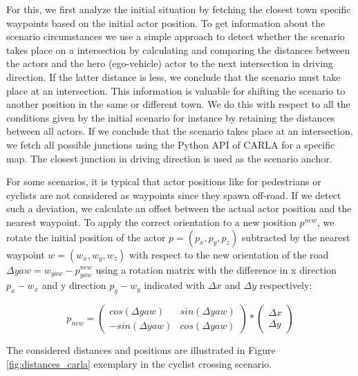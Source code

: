 \documentclass[conference, a4paper, 11pt]{IEEEtran}
\begin{document}
For this, we first analyze the initial situation by fetching the closest town specific waypoints based on the initial actor position. To get information about the scenario circumstances we use a simple approach to detect whether the scenario takes place on a intersection by calculating and comparing the distances between the actors and the hero (ego-vehicle) actor to the next intersection in driving direction. If the latter distance is less, we conclude that the scenario must take place at an intersection. This information is valuable for shifting the scenario to another  position in the same or different town. We do this with respect to all the conditions given by the initial scenario for instance by retaining the distances between all actors.
If we conclude that the scenario takes place at an intersection, we fetch all possible junctions using the Python API of CARLA for a specific map. The closest junction in driving direction is used  as the scenario anchor. 

For some scenarios, it is typical that actor positions like for pedestrians or cyclists are not considered as waypoints since they spawn off-road.  If we detect such a deviation, we calculate an offset between the actual actor position and the nearest waypoint. To apply the correct orientation to a new position $p^{new}$, we rotate the initial position of the actor $p = (p_x,p_y,p_z)$ subtracted by the nearest waypoint $w = (w_x, w_y, w_z)$ with respect to the new orientation of the road $\Delta yaw = w_{yaw} - p^{new}_{yaw}$  using a rotation matrix with the difference in x direction $p_x - w_x$ and y direction $p_y - w_y$ indicated with $\Delta x$ and $\Delta y$ respectively:

\begin{equation}
	p_{new} = \left(\begin{matrix} cos(\Delta yaw) & sin(\Delta yaw) \\ - sin(\Delta yaw) & cos(\Delta yaw) \end{matrix}\right) *  \left(\begin{matrix} \Delta x \\ \Delta y \end{matrix}\right) 
\end{equation}


The considered distances and positions are illustrated  in Figure \ref{fig:distances_carla} exemplary in the cyclist crossing scenario.
\end{document}
